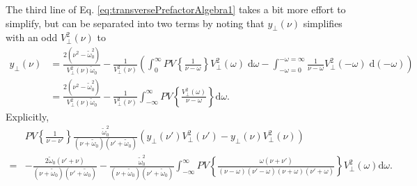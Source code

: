 \documentclass{article}
\begin{document}
The third line of Eq. \eqref{eq:transversePrefactorAlgebra1} takes a bit more effort to simplify, but can be separated into two terms by noting that $y_\perp(\nu)$ simplifies with an odd $V_\perp^2(\nu)$ to
\begin{equation}
\begin{split}
y_\perp(\nu) &= \frac{2(\nu^2 - \tilde{\omega}_0^2)}{V_\perp^2(\nu)\tilde{\omega}_0} - \frac{1}{V_\perp^2(\nu)}\left(\int_0^\infty PV\left\{\frac{1}{\nu - \omega}\right\}V_\perp^2(\omega)\;\mathrm{d}\omega - \int_{-\omega = 0}^{-\omega = \infty}\frac{1}{\nu - \omega}V_\perp^2(-\omega)\;\mathrm{d}(-\omega)\right)\\
&= \frac{2(\nu^2 - \tilde{\omega}_0^2)}{V_\perp^2(\nu)\tilde{\omega}_0} - \frac{1}{V_\perp^2(\nu)}\int_{-\infty}^\infty PV\left\{\frac{V_\perp^2(\omega)}{\nu - \omega}\right\}\mathrm{d}\omega.
\end{split}
\end{equation}
Explicitly,
\begin{equation}
\begin{split}
&PV\left\{\frac{1}{\nu - \nu'}\right\}\frac{\tilde{\omega}_0^2}{(\nu + \tilde{\omega}_0)(\nu' + \tilde{\omega}_0)}\left(y_\perp(\nu')V_\perp^2(\nu') - y_\perp(\nu)V_\perp^2(\nu)\right)\\
=& -\frac{2\tilde{\omega}_0(\nu' + \nu)}{(\nu + \tilde{\omega}_0)(\nu' + \tilde{\omega}_0)} - \frac{\tilde{\omega}_0^2}{(\nu + \tilde{\omega}_0)(\nu' + \tilde{\omega}_0)}\int_{-\infty}^\infty PV\left\{\frac{\omega(\nu + \nu')}{(\nu - \omega)(\nu' - \omega)(\nu + \omega)(\nu' + \omega)}\right\}V_\perp^2(\omega)\mathrm{d}\omega.
\end{split}
\end{equation}
\end{document}
